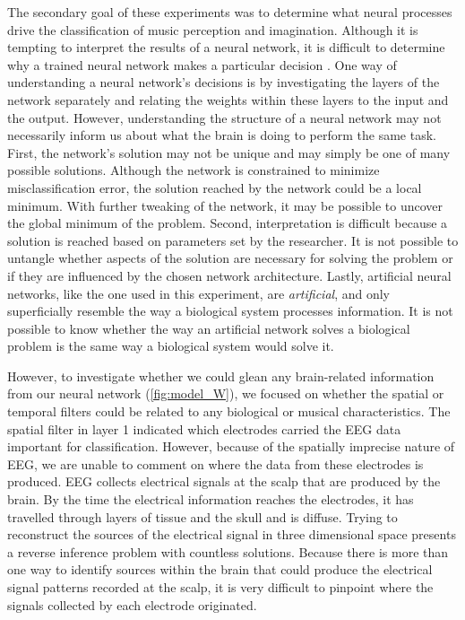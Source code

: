 The secondary goal of these experiments was to determine what neural processes drive the classification of music perception and imagination.
Although it is tempting to interpret the results of a neural network, it is difficult to determine why a trained neural network makes a particular decision \cite{towell_1992_interpretation}.
One way of understanding a neural network's decisions is by investigating the layers of the network separately and relating the weights within these layers to the input and the output. 
However, understanding the structure of a neural network may not necessarily inform us about what the brain is doing to perform the same task. 
First, the network's solution may not be unique and may simply be one of many possible solutions. 
Although the network is constrained to minimize misclassification error, the solution reached by the network could be a local minimum. 
With further tweaking of the network, it may be possible to uncover the global minimum of the problem. 
Second, interpretation is difficult because a solution is reached based on parameters set by the researcher. 
It is not possible to untangle whether aspects of the solution are necessary for solving the problem or if they are influenced by the chosen network architecture. 
Lastly, artificial neural networks, like the one used in this experiment, are \emph{artificial}, and only superficially resemble the way a biological system processes information. 
It is not possible to know whether the way an artificial network solves a biological problem is the same way a biological system would solve it. 

However, to investigate whether we could glean any brain-related information from our neural network (\autoref{fig:model_W}), we focused on whether the spatial or temporal filters could be related to any biological or musical characteristics.
The spatial filter in layer 1 indicated which electrodes carried the \ac{EEG} data important for classification. 
However, because of the spatially imprecise nature of \ac{EEG}, we are unable to comment on where the data from these electrodes is produced.
\ac{EEG} collects electrical signals at the scalp that are produced by the brain.
By the time the electrical information reaches the electrodes, it has travelled through layers of tissue and the skull and is diffuse.
Trying to reconstruct the sources of the electrical signal in three dimensional space presents a reverse inference problem with countless solutions.
Because there is more than one way to identify sources within the brain that could produce the electrical signal patterns recorded at the scalp, it is very difficult to pinpoint where the signals collected by each electrode originated.

